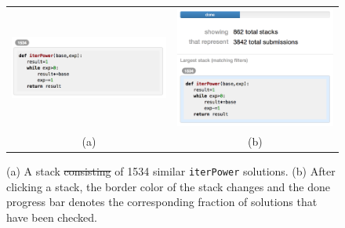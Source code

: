 \documentclass[12pt,twoside]{mitthesis}
\newcommand \codevar[1]{\texttt{#1}}
\providecommand{\DIFdeltex}[1]{{\protect\color{red}\sout{#1}}}                      %
\providecommand{\DIFdelFL}[1]{\DIFdel{#1}} %
\providecommand{\DIFdelbeginFL}{} %
\providecommand{\DIFdelendFL}{} %
\providecommand{\DIFdel}[1]{\texorpdfstring{\DIFdeltex{#1}}{}} %
\begin{document}
\begin{figure}[htpb]
\begin{tabular}{c | c}
\begin{minipage}{.5\linewidth}
\centering
\includegraphics[width=0.95\linewidth]{Body/figures/overcode/stackScreenShot.png}
\end{minipage}
&
\begin{minipage}{.5\linewidth}
\centering
\includegraphics[width=0.95\linewidth]{Body/figures/overcode/checkDone.png}
\end{minipage}
\\
(a) & (b)
\end{tabular}
\caption{(a) A stack \DIFdelbeginFL \DIFdelFL{consisting }\DIFdelendFL of 1534 similar \codevar{iterPower} solutions. (b) After clicking a stack, the border color of the stack changes and the done progress bar denotes the corresponding fraction of solutions that have been checked.}
\label{stacks}
\end{figure}
\end{document}

